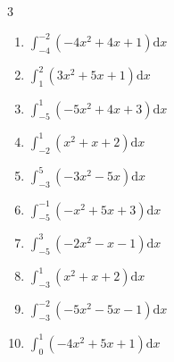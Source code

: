 \begin{multicols}{3}
\begin{enumerate}

\columnbreak %

  \item $\displaystyle \int_{-4}^{-2}\left( -4x^{2}+4x+1 \right) \mathrm{d}x$


  \item $\displaystyle \int_{1}^{2}\left( 3x^{2}+5x+1 \right) \mathrm{d}x$


  \item $\displaystyle \int_{-5}^{1}\left( -5x^{2}+4x+3 \right) \mathrm{d}x$

        \phantom{$\displaystyle =-255$}

  \item $\displaystyle \int_{-2}^{1}\left( x^{2}+x+2 \right) \mathrm{d}x$


  \item $\displaystyle \int_{-3}^{5}\left( -3x^{2}-5x \right) \mathrm{d}x$

        \phantom{$\displaystyle =-192$}

\columnbreak %

  \item $\displaystyle \int_{-5}^{-1}\left( -x^{2}+5x+3 \right) \mathrm{d}x$


  \item $\displaystyle \int_{-5}^{3}\left( -2x^{2}-x-1 \right) \mathrm{d}x$


  \item $\displaystyle \int_{-3}^{1}\left( x^{2}+x+2 \right) \mathrm{d}x$


  \item $\displaystyle \int_{-3}^{-2}\left( -5x^{2}-5x-1 \right) \mathrm{d}x$


  \item $\displaystyle \int_{0}^{1}\left( -4x^{2}+5x+1 \right) \mathrm{d}x$



\end{enumerate}
\end{multicols}
